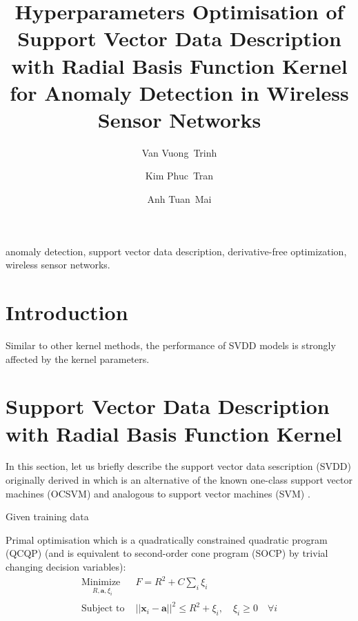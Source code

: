 \documentclass[3p,times]{elsarticle}
\begin{document}
\begin{frontmatter}

\title{Hyperparameters Optimisation of Support Vector Data Description with Radial Basis Function Kernel for Anomaly Detection in Wireless Sensor Networks}

\author[donga]{Van Vuong~Trinh}

\author[donga]{Kim Phuc~Tran}

\author[hust]{Anh Tuan~Mai}

\address[donga]{Dong A University, Vietnam}  
\address[hust]{International Training Institute for Materials Science (ITIMS)\\Hanoi University of Technology, Vietnam} 

\begin{keyword}
anomaly detection, support vector data description, derivative-free optimization, wireless sensor networks.
\end{keyword}

\begin{abstract}
\end{abstract}

\end{frontmatter}

\section{Introduction}

Similar to other kernel methods, the performance of SVDD models is strongly affected by the kernel parameters.

\section{Support Vector Data Description with Radial Basis Function Kernel}

In this section, let us briefly describe the support vector data sescription (SVDD) originally derived in \cite{Tax2004} which is an alternative of the known one-class support vector machines (OCSVM) \cite{Scholkopf2000} and analogous to support vector machines (SVM) \cite{Vapnik1998}.

Given training data

Primal optimisation which is a quadratically constrained quadratic program (QCQP) (and is equivalent to second-order cone program (SOCP) by trivial changing decision variables):
\begin{subequations}\label{eq:svdd_primal}
\begin{align}
\underset{
	\begin{array}{c}
		 R, \mathbf{a}, \xi_i
	\end{array}}{\text{Minimize }} & F = R^2 + C \sum_i \xi_i \\
\text{Subject to } & \left|\left| \mathbf{x}_i - \mathbf{a} \right|\right|^2 \le R^2 + \xi_i, \quad \xi_i \ge 0 \quad \forall i
\end{align}
\end{subequations}
\end{document}
